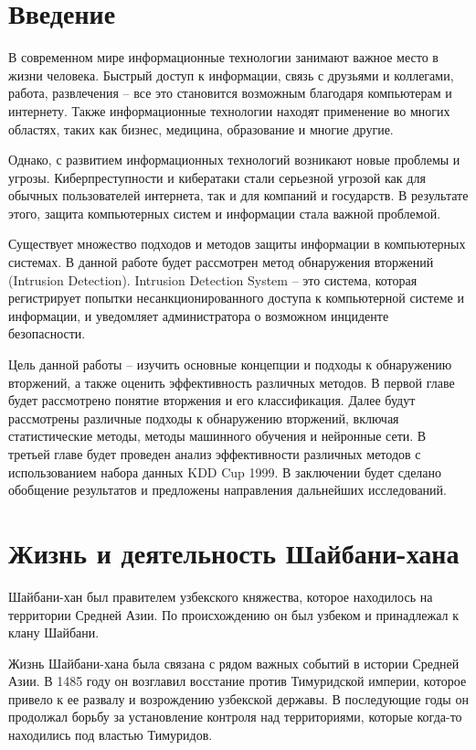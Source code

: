 \documentclass[draft]{article}
\begin{document}
\begin{center}
\end{center}
\newpage
\tableofcontents
\newpage\section{Введение}

В современном мире информационные технологии занимают важное место в жизни человека. Быстрый доступ к информации, связь с друзьями и коллегами, работа, развлечения – все это становится возможным благодаря компьютерам и интернету. Также информационные технологии находят применение во многих областях, таких как бизнес, медицина, образование и многие другие.

Однако, с развитием информационных технологий возникают новые проблемы и угрозы. Киберпреступности и кибератаки стали серьезной угрозой как для обычных пользователей интернета, так и для компаний и государств. В результате этого, защита компьютерных систем и информации стала важной проблемой.

Существует множество подходов и методов защиты информации в компьютерных системах. В данной работе будет рассмотрен метод обнаружения вторжений (Intrusion Detection). Intrusion Detection System – это система, которая регистрирует попытки несанкционированного доступа к компьютерной системе и информации, и уведомляет администратора о возможном инциденте безопасности. 

Цель данной работы – изучить основные концепции и подходы к обнаружению вторжений, а также оценить эффективность различных методов. В первой главе будет рассмотрено понятие вторжения и его классификация. Далее будут рассмотрены различные подходы к обнаружению вторжений, включая статистические методы, методы машинного обучения и нейронные сети. В третьей главе будет проведен анализ эффективности различных методов с использованием набора данных KDD Cup 1999. В заключении будет сделано обобщение результатов и предложены направления дальнейших исследований.\newpage\section{Жизнь и деятельность Шайбани-хана}

Шайбани-хан был правителем узбекского княжества, которое находилось на территории Средней Азии. По происхождению он был узбеком и принадлежал к клану Шайбани.

Жизнь Шайбани-хана была связана с рядом важных событий в истории Средней Азии. В 1485 году он возглавил восстание против Тимуридской империи, которое привело к ее развалу и возрождению узбекской державы. В последующие годы он продолжал борьбу за установление контроля над территориями, которые когда-то находились под властью Тимуридов.
\end{document}
